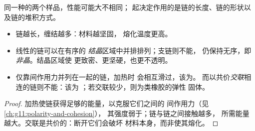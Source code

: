 同一种的两个样品，性能可能大不相同；
起决定作用的是链的长度、链的形状以及链的堆积方式。

\begin{proposition}[链与性质]\label{prop:g12:polymers:properties}
\begin{itemize}
  \item 链越长，缠结越多：材料越坚固，
        熔化温度更高。
  \item 线性的链可以在有序的
        \emph{结晶}区域中并排排列；支链则不能，
        仍保持无序，即\emph{非晶}。结晶区域使
        更致密、更坚硬，也更不透明。
  \item 仅靠间作用力并列在一起的链，加热时
        会相互滑过，该为。
        而以共价\emph{交联}相连的链则不能：该为
        ；若交联较少，则为类橡胶的弹性
        固体。
\end{itemize}
\end{proposition}

\begin{proof}
加热使链获得足够的能量，以克服它们之间的
间作用力（见\cref{ch:g11:polarity-and-cohesion}），
其强度弱于；链与链之间接触越多，
所需能量越大。交联是共价的：断开它们会破坏
材料本身，而非使其熔化。
\end{proof}

